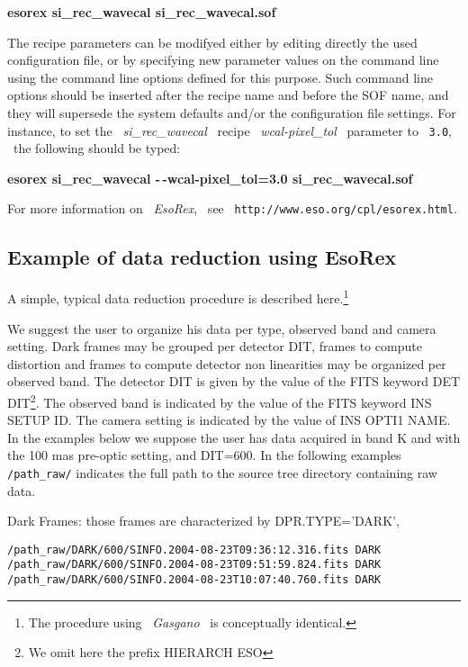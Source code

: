 \begin{description}
   {\bf esorex si\_rec\_wavecal si\_rec\_wavecal.sof}

The recipe parameters can be modifyed either by editing directly the 
used configuration file, or by specifying new parameter values
on the command line using the command line options defined for this
purpose. Such command line options should be inserted after the
recipe name and before the SOF name, and they will supersede the
system defaults and/or the configuration file settings. For instance, 
to set the
\ {\it si\_rec\_wavecal} \ recipe \ {\it wcal-pixel\_tol} \ parameter to 
\ {\tt 3.0},
\ the following should be typed:


   {\bf esorex si\_rec\_wavecal -\,-wcal-pixel\_tol=3.0 si\_rec\_wavecal.sof}


\end{description}

For more information on \ {\it EsoRex}, \ see 
\ {\tt http://www.eso.org/cpl/esorex.html}.


\subsection{Example of data reduction using EsoRex}
\label{EXIFU}

A simple, typical data reduction procedure is described 
here.\footnote{The procedure using \ {\it Gasgano} 
\ is conceptually identical.}


We suggest the user to organize his data per type, 
observed band and camera setting. Dark frames may be
grouped per detector DIT, frames to compute distortion and frames to
compute detector non linearities may be organized
per observed band. The detector DIT is given by the value of the
FITS keyword DET DIT\footnote{We omit here the prefix HIERARCH ESO}. 
The observed band is indicated by the value of the FITS keyword 
INS SETUP ID. The camera setting is indicated by the value of
INS OPTI1 NAME. In the examples below we suppose the user has data 
acquired in band K and with the 100 mas pre-optic setting, and DIT=600.
In the following examples {\tt /path\_raw/} indicates the full path to the
source tree directory containing raw data.

Dark Frames: those frames are characterized by DPR.TYPE='DARK',

\begin{verbatim}
/path_raw/DARK/600/SINFO.2004-08-23T09:36:12.316.fits DARK
/path_raw/DARK/600/SINFO.2004-08-23T09:51:59.824.fits DARK
/path_raw/DARK/600/SINFO.2004-08-23T10:07:40.760.fits DARK
\end{verbatim}


